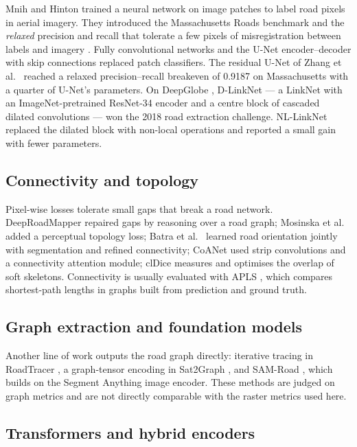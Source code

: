 \documentclass[11pt]{article}
\begin{document}
Mnih and Hinton \cite{mnih2010} trained a neural network on image patches to label road pixels
in aerial imagery. They introduced the Massachusetts Roads benchmark and the \emph{relaxed}
precision and recall that tolerate a few pixels of misregistration between labels and imagery
\cite{mnih2013}. Fully convolutional networks \cite{long2015} and the U-Net encoder--decoder with
skip connections \cite{ronneberger2015} replaced patch classifiers. The residual U-Net of Zhang
et al.\ \cite{zhang2018res} reached a relaxed precision--recall breakeven of 0.9187 on
Massachusetts with a quarter of U-Net's parameters. On DeepGlobe \cite{demir2018},
D-LinkNet \cite{zhou2018} --- a LinkNet with an ImageNet-pretrained ResNet-34 encoder and a
centre block of cascaded dilated convolutions --- won the 2018 road extraction challenge.
NL-LinkNet \cite{wang2019nl} replaced the dilated block with non-local operations and reported
a small gain with fewer parameters.

\subsection{Connectivity and topology}

Pixel-wise losses tolerate small gaps that break a road network. DeepRoadMapper
\cite{mattyus2017} repaired gaps by reasoning over a road graph; Mosinska et al.\
\cite{mosinska2018} added a perceptual topology loss; Batra et al.\ \cite{batra2019} learned road
orientation jointly with segmentation and refined connectivity; CoANet \cite{mei2021} used strip
convolutions and a connectivity attention module; clDice \cite{shit2021} measures and optimises
the overlap of soft skeletons. Connectivity is usually evaluated with APLS \cite{vanetten2018},
which compares shortest-path lengths in graphs built from prediction and ground truth.

\subsection{Graph extraction and foundation models}

Another line of work outputs the road graph directly: iterative tracing in RoadTracer
\cite{bastani2018}, a graph-tensor encoding in Sat2Graph \cite{he2020sat2graph}, and SAM-Road
\cite{hetang2024}, which builds on the Segment Anything image encoder. These methods are judged
on graph metrics and are not directly comparable with the raster metrics used here.

\subsection{Transformers and hybrid encoders}
\end{document}

